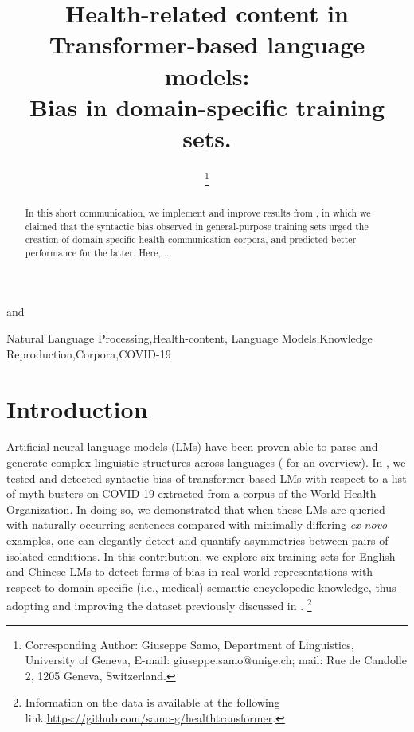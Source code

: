 \documentclass{IOS-Book-Article}
\def\hb{\hbox to 11.5 cm{}}
\begin{document}
\pagestyle{headings}
\def\thepage{}
\begin{frontmatter}              %


\title{Health-related content in Transformer-based language models:\\ Bias in domain-specific training sets.}

\markboth{}{January 2023\hb}


\author[A]{ %
}
and
\author[B]{ 
\thanks{Corresponding Author: Giuseppe Samo, Department of Linguistics, University of Geneva, E-mail: giuseppe.samo@unige.ch; mail: Rue de Candolle 2, 1205 Geneva, Switzerland. }}
\address[A]{University of Cambridge}
\address[B]{University of Geneva}

\begin{abstract}
In this short communication, we implement and improve results from \cite{r2}, in which we claimed that the syntactic bias observed in general-purpose training sets urged the creation of domain-specific health-communication corpora, and predicted better performance for the latter. Here, ...
\end{abstract}

\begin{keyword}
Natural Language Processing\sep Health-content\sep 
Language Models\sep Knowledge Reproduction\sep Corpora\sep COVID-19
\end{keyword}
\end{frontmatter}
\markboth{January 2023\hb}{January 2023\hb}

\section{Introduction}

Artificial neural language models (LMs) have been proven able to parse and generate complex linguistic structures across languages (\cite{r1} for an overview). 
In \cite{r2}, we tested and detected syntactic bias of transformer-based LMs with respect to a list of myth busters on COVID-19 extracted from a corpus of the World Health Organization. In doing so, we demonstrated that when these LMs are queried with naturally occurring sentences compared with minimally differing \textit{ex-novo} examples, one can elegantly detect and quantify asymmetries between pairs of isolated conditions.
 In this contribution, we explore six training sets for English and Chinese LMs to detect forms of bias in real-world representations with respect to domain-specific (i.e., medical) semantic-encyclopedic knowledge, thus adopting and improving the dataset previously discussed in \cite{r2}. \footnote{Information on the data is available at the following link:\href{https://github.com/samo-g/healthtransformer}{\underline{https://github.com/samo-g/healthtransformer}}.}
\end{document}
